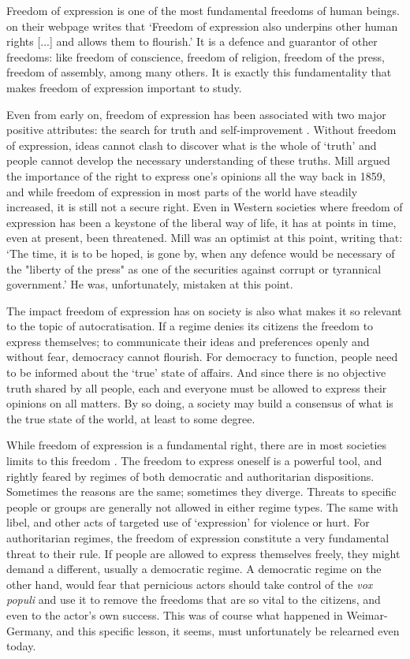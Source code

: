 Freedom of expression is one of the most fundamental freedoms of human beings. \citet{amnesty_international_freedom_2023} on their webpage writes that `Freedom of expression also underpins other human rights [...] and allows them to flourish.'  It is a defence and guarantor of other freedoms: like freedom of conscience, freedom of religion, freedom of the press, freedom of assembly, among many others. It is exactly this fundamentality that makes freedom of expression important to study.

Even from early on, freedom of expression has been associated with two major positive attributes: the search for truth and self-improvement \citep[pp. 25-80]{mill_liberty_2010}. Without freedom of expression, ideas cannot clash to discover what is the whole of `truth' and people cannot develop the necessary understanding of these truths. Mill argued the importance of the right to express one's opinions all the way back in 1859, and while freedom of expression in most parts of the world have steadily increased, it is still not a secure right. Even in Western societies where freedom of expression has been a keystone of the liberal way of life, it has at points in time, even at present, been threatened. Mill was an optimist at this point, writing that: `The time, it is to be hoped, is gone by, when any defence would be necessary of the "liberty of the press" as one of the securities against corrupt or tyrannical government.'  \citep[p. 25]{mill_liberty_2010} He was, unfortunately, mistaken at this point. 

The impact freedom of expression has on society is also what makes it so relevant to the topic of autocratisation. If a regime denies its citizens the freedom to express themselves; to communicate their ideas and preferences openly and without fear, democracy cannot flourish. For democracy to function, people need to be informed about the `true' state of affairs. And since there is no objective truth shared by all people, each and everyone must be allowed to express their opinions on all matters. By so doing, a society may build a consensus of what is the true state of the world, at least to some degree. 

While freedom of expression is a fundamental right, there are in most societies limits to this freedom \citep{bonotti_freedom_2021}. The freedom to express oneself is a powerful tool, and rightly feared by regimes of both democratic and authoritarian dispositions. Sometimes the reasons are the same; sometimes they diverge. Threats to specific people or groups are generally not allowed in either regime types. The same with libel, and other acts of targeted use of `expression' for violence or hurt. For authoritarian regimes, the freedom of expression constitute a very fundamental threat to their rule. If people are allowed to express themselves freely, they might demand a different, usually a democratic regime. A democratic regime on the other hand, would fear that pernicious actors should take control of the \textit{vox populi} and use it to remove the freedoms that are so vital to the citizens, and even to the actor's own success. This was of course what happened in Weimar-Germany, and this specific lesson, it seems, must unfortunately be relearned even today. 

